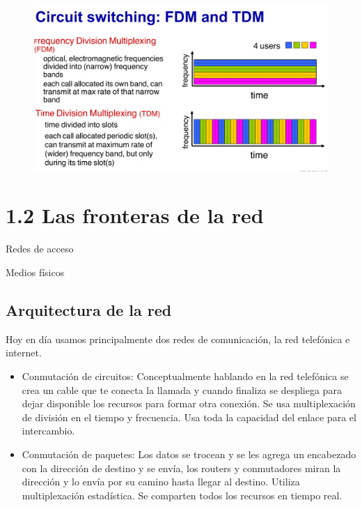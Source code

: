 \documentclass[12pt, twoside, openright]{report} %
\begin{document}
\begin{figure}[H]
	{\includegraphics[scale=.25]{Untitled.png}}
\end{figure}

\section{1.2 Las fronteras de la red}

Redes de acceso

Medios físicos

\pagebreak
\subsection{Arquitectura de la red}

Hoy en día usamos principalmente dos redes de comunicación, la red
telefónica e internet.

\begin{itemize}
	\item Conmutación de circuitos: Conceptualmente hablando en la red
	      telefónica se crea un cable que te conecta la llamada y cuando
	      finaliza se despliega para dejar disponible los recursos para formar
	      otra conexión. Se usa multiplexación de división en el tiempo y
	      frecuencia. Usa toda la capacidad del enlace para el intercambio.
	\item Conmutación de paquetes: Los datos se trocean y se les agrega un
	      encabezado con la dirección de destino y se envía, los routers y
	      conmutadores miran la dirección y lo envía por su camino hasta llegar
	      al destino. Utiliza multiplexación estadística. Se comparten todos los
	      recursos en tiempo real.
\end{itemize}
\end{document}
